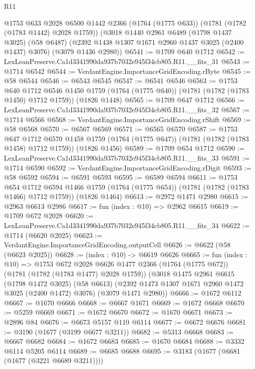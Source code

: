 \begin{lexlean}{R11}
\begin{coremodule}
  @1753
    @633
    @2028
    @6500
    @1442
    @2366
    (@1764 (@1775 @633))
    (@1781 (@1782 (@1783 @1442) @2028 @1759))
    (@3018
      @1440
      @2961
      @6489
      (@1798 @1437 @3025)
      (@58 @6487)
      (@2392 @1438 @1307 @1671 @2960 @1437 @3025 (@2400 @1437) @3076)
      (@3079 @1436 @2980))
@6541 := @1709 @640 @1712
@6542 := LexLeanPreserve.Ca1d3341990da937b7032e945f34cb805.R11.__fits_31
@6543 := @1714 @6542
@6544 := VerdantEngine.ImportanceGridEncoding.rByte
@6545 := @58 @6544
@6546 := @6543 @6545
@6547 := @6541 @6546
@6563 := @1753
    @640
    @1712
    @6546
    @1450
    @1759
    (@1764 (@1775 @640))
    (@1781 (@1782 (@1783 @1450) @1712 @1759))
    (@1826 @1448)
@6565 := @1709 @647 @1712
@6566 := LexLeanPreserve.Ca1d3341990da937b7032e945f34cb805.R11.__fits_32
@6567 := @1714 @6566
@6568 := VerdantEngine.ImportanceGridEncoding.rShift
@6569 := @58 @6568
@6570 := @6567 @6569
@6571 := @6565 @6570
@6587 := @1753
    @647
    @1712
    @6570
    @1458
    @1759
    (@1764 (@1775 @647))
    (@1781 (@1782 (@1783 @1458) @1712 @1759))
    (@1826 @1456)
@6589 := @1709 @654 @1712
@6590 := LexLeanPreserve.Ca1d3341990da937b7032e945f34cb805.R11.__fits_33
@6591 := @1714 @6590
@6592 := VerdantEngine.ImportanceGridEncoding.rDigit
@6593 := @58 @6592
@6594 := @6591 @6593
@6595 := @6589 @6594
@6611 := @1753
    @654
    @1712
    @6594
    @1466
    @1759
    (@1764 (@1775 @654))
    (@1781 (@1782 (@1783 @1466) @1712 @1759))
    (@1826 @1464)
@6613 := @2972 @1471 @2980
@6615 := @2963 @6613 @2986
@6617 := fun (index : @10) => @2962 @6615
@6619 := @1709 @672 @2028
@6620 := LexLeanPreserve.Ca1d3341990da937b7032e945f34cb805.R11.__fits_34
@6622 := @1714 (@6620 @2025)
@6623 := VerdantEngine.ImportanceGridEncoding.outputCell
@6626 := @6622 (@58 (@6623 @2025))
@6628 := (index : @10) -> @6619 @6626
@6665 := fun (index : @10) =>
  @1753
    @672
    @2028
    @6626
    @1477
    @2366
    (@1764 (@1775 @672))
    (@1781 (@1782 (@1783 @1477) @2028 @1759))
    (@3018
      @1475
      @2961
      @6615
      (@1798 @1472 @3025)
      (@58 @6613)
      (@2392 @1473 @1307 @1671 @2960 @1472 @3025 (@2400 @1472) @3076)
      (@3079 @1471 @2980))
@6666 := @1672 @6112
@6667 := @1670 @6666
@6668 := @6667 @1671
@6669 := @1672 @6668
@6670 := @5259 @6669
@6671 := @1672 @6670
@6672 := @1670 @6671
@6673 := @2896 @84
@6676 := @6673 @5157 @110 @6114
@6677 := @6672 @6676
@6681 := @3190 (@1677 (@3199 @6677 @3211))
@6682 := @5313 @6668
@6683 := @6667 @6682
@6684 := @1672 @6683
@6685 := @1670 @6684
@6688 := @3332 @6114 @5205 @6114
@6689 := @6685 @6688
@6695 := @3183 (@1677 (@6681 (@1677 (@3221 @6689 @3211))))

\end{coremodule}
\end{lexlean}

